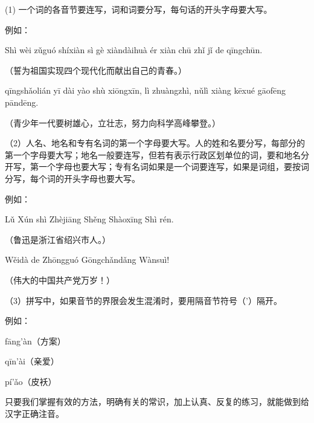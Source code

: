 (1) 一个词的各音节要连写，词和词要分写，每句话的开头字母要大写。

例如：
\vspace{1em}

Shì wèi zǔguó shíxiàn sì gè xiàndàihuà ér xiàn chū zhǐ jǐ de qīngchūn.

（誓为祖国实现四个现代化而献出自己的青春。）
\vspace{1em}

qīngshǎolián yī dài yào shù xiōngxīn, lì zhuàngzhì, nǔlì xiàng kēxué gāofēng pāndēng.

（青少年一代要树雄心，立壮志，努力向科学高峰攀登。）
\newpage

（2）人名、地名和专有名词的第一个字母要大写。人的姓和名要分写，每部分的第一个字母要大写；地名一般要连写，但若有表示行政区划单位的词，要和地名分开写，第一个字母也要大写；专有名词如果是一个词要连写，如果是词组，要按词分写，每个词的开头字母也要大写。

例如：
\vspace{1em}

Lǔ Xún shì Zhèjiāng Shěng Shàoxīng Shì rén.

（鲁迅是浙江省绍兴市人。）
\vspace{1em}

Wěidà de Zhōngguó Gōngchǎndǎng Wànsuì!

（伟大的中国共产党万岁！）

（3）拼写中，如果音节的界限会发生混淆时，要用隔音节符号（’）隔开。

例如：

fāng’àn（方案）

qīn’ài（亲爱）

pí’ǎo（皮袄）

只要我们掌握有效的方法，明确有关的常识，加上认真、反复的练习，就能做到给汉字正确注音。
\newpage
